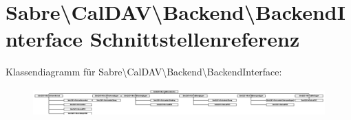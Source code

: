 \hypertarget{interface_sabre_1_1_cal_d_a_v_1_1_backend_1_1_backend_interface}{}\section{Sabre\textbackslash{}Cal\+D\+AV\textbackslash{}Backend\textbackslash{}Backend\+Interface Schnittstellenreferenz}
\label{interface_sabre_1_1_cal_d_a_v_1_1_backend_1_1_backend_interface}
Klassendiagramm für Sabre\textbackslash{}Cal\+D\+AV\textbackslash{}Backend\textbackslash{}Backend\+Interface\+:\begin{figure}[H]
\begin{center}
\leavevmode
\includegraphics[height=1.098039cm]{interface_sabre_1_1_cal_d_a_v_1_1_backend_1_1_backend_interface}
\end{center}
\end{figure}
